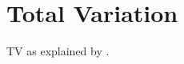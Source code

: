 \section{Total Variation}
\label{sec:total-variation}

TV as explained by \cite[sec. 6.7]{LeVequeFVMforHP}.
